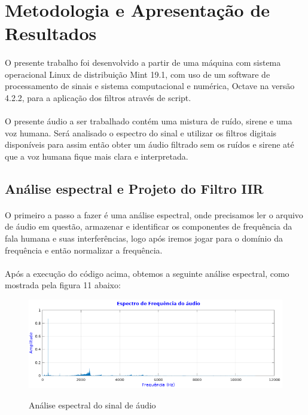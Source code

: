 \documentclass[12pt,fleqn]{article}
\begin{document}
\section{Metodologia e Apresentação de Resultados}
\paragraph{} O presente trabalho foi desenvolvido a partir de uma máquina com sistema operacional Linux de distribuição Mint 19.1, com uso de um software de processamento de sinais e sistema computacional e numérica, Octave na versão 4.2.2, para a aplicação dos filtros através de script.
\paragraph{} O presente áudio a ser trabalhado contém uma mistura de ruído, sirene e uma voz humana. Será analisado o espectro do sinal e utilizar os filtros digitais disponíveis para assim então obter um áudio filtrado sem os ruídos e sirene até que a voz humana fique mais clara e interpretada.

\subsection{Análise espectral e Projeto do Filtro IIR}
\paragraph{} O primeiro a passo a fazer é uma análise espectral, onde precisamos ler o arquivo de áudio em questão, armazenar e identificar os componentes de frequência da fala humana e suas interferências, logo após iremos jogar para o domínio da frequência e então normalizar a frequência.


\paragraph{} Após a execução do código acima, obtemos a seguinte análise espectral, como mostrada pela figura 11 abaixo:

\begin{figure}[!htb]
    \centering
    \includegraphics[scale=0.6]{fig/sinal1.png}
    \label{figura:figura7}
    \caption{Análise espectral do sinal de áudio}
\end{figure}
\end{document}
